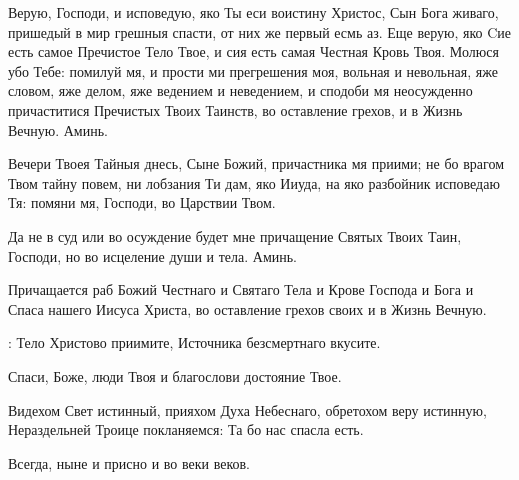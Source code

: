 \begin{mymulticols}

 Верую, Господи, и исповедую, яко Ты еси воистину Христос, Сын Бога живаго, пришедый в мир грешныя спасти, от них же первый есмь аз. Еще верую, яко Cие есть самое Пречистое Тело Твое, и сия есть самая Честная Кровь Твоя. Молюся убо Тебе: помилуй мя, и прости ми прегрешения моя, вольная и невольная, яже словом, яже делом, яже ведением и неведением, и сподоби мя неосужденно причаститися Пречистых Твоих Таинств, во оставление грехов, и в Жизнь Вечную. Аминь.

Вечери Твоея Тайныя днесь, Сыне Божий, причастника мя приими; не бо врагом Твом тайну повем, ни лобзания Ти дам, яко Ииуда, на яко разбойник исповедаю Тя: помяни мя, Господи, во Царствии Твом.

Да не в суд или во осуждение будет мне причащение Святых Твоих Таин, Господи, но во исцеление души и тела. Аминь.


 Причащается раб Божий  Честнаго и Святаго Тела и Крове Господа и Бога и Спаса нашего Иисуса Христа, во оставление грехов своих и в Жизнь Вечную. 

: Тело Христово приимите, Источника безсмертнаго вкусите.


 Спаси, Боже, люди Твоя и благослови достояние Твое.


 Видехом Свет истинный, прияхом Духа Небеснаго, обретохом веру истинную, Нераздельней Троице покланяемся: Та бо нас спасла есть.


 Всегда, ныне и присно и во веки веков.


\end{mymulticols}
